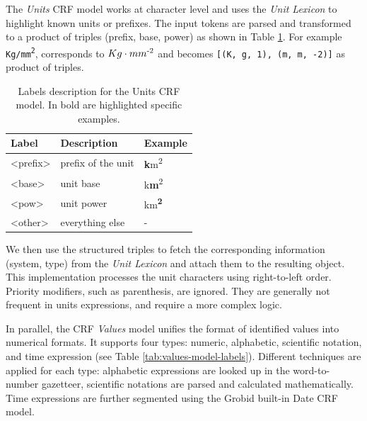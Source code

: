 The \textit{Units} CRF model works at character level and uses the \textit{Unit Lexicon} to highlight known units or prefixes. The input tokens are parsed and transformed to a product of triples (prefix, base, power) as shown in Table \ref{tab:units-model-labels}. For example \texttt{Kg/mm\textsuperscript{2}}, corresponds to \texttt{$Kg\cdot mm\textsuperscript{-2}$} and becomes \texttt{[(K, g, 1), (m, m, -2)]} as product of triples. 

\begin{table}[ht]
  \caption{Labels description for the Units CRF model. In bold are highlighted specific examples. }
  \label{tab:units-model-labels}
  \begin{tabular}{lll}
    \toprule
    Label & Description & Example\\
    \midrule
    <prefix> & prefix of the unit  & \textbf{k}m\textsuperscript{2} \\
    <base> & unit base & k\textbf{m}\textsuperscript{2}\\
    <pow> & unit power & km\textsuperscript{\textbf{2}}\\
    <other> & everything else & - \\
  \bottomrule
\end{tabular}
\end{table}

We then use the structured triples to fetch the corresponding information (system, type) from the \textit{Unit Lexicon} and attach them to the resulting object. 
This implementation processes the unit characters using right-to-left order. 
Priority modifiers, such as parenthesis, are ignored. They are generally not frequent in units expressions, and require a more complex logic.

In parallel, the CRF \textit{Values} model unifies the format of identified values into numerical formats. It supports four types: numeric, alphabetic, scientific notation, and time expression (see Table \ref{tab:values-model-labels}). Different techniques are applied for each type: alphabetic expressions are looked up in the word-to-number gazetteer, scientific notations are parsed and calculated mathematically. Time expressions are further segmented using the Grobid built-in Date CRF model.

